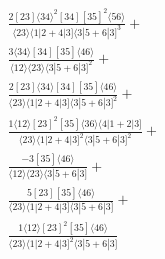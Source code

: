 \documentclass[varwidth, border=5pt]{standalone}
\begin{document}
\begin{my}
$\begin{gathered}
\scriptscriptstyle\frac{2[23]⟨34⟩^2[34][35]^2⟨56⟩}{⟨23⟩⟨1|2+4|3]⟨3|5+6|3]^3}+\\
\scriptscriptstyle\frac{3⟨34⟩[34][35]⟨46⟩}{⟨12⟩⟨23⟩⟨3|5+6|3]^2}+\\
\scriptscriptstyle\frac{2[23]⟨34⟩[34][35]⟨46⟩}{⟨23⟩⟨1|2+4|3]⟨3|5+6|3]^2}+\\
\scriptscriptstyle\frac{1⟨12⟩[23]^2[35]⟨36⟩⟨4|1+2|3]}{⟨23⟩⟨1|2+4|3]^2⟨3|5+6|3]^2}+\\
\scriptscriptstyle\frac{-3[35]⟨46⟩}{⟨12⟩⟨23⟩⟨3|5+6|3]}+\\
\scriptscriptstyle\frac{5[23][35]⟨46⟩}{⟨23⟩⟨1|2+4|3]⟨3|5+6|3]}+\\
\scriptscriptstyle\frac{1⟨12⟩[23]^2[35]⟨46⟩}{⟨23⟩⟨1|2+4|3]^2⟨3|5+6|3]}\phantom{+}
\end{gathered}$
\end{my}
\end{document}
